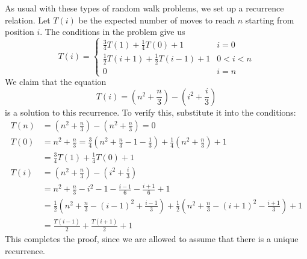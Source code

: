 \documentclass[11pt,letterpaper]{article}
\begin{document}
\begin{solution}
    As usual with these types of random walk problems, we set up a recurrence relation. Let $T(i)$ be the expected number of moves to reach $n$ starting from position $i$. The conditions in the problem give us 
    \[
        T(i)=\begin{cases}
            \frac{3}{4}T(1)+\frac{1}{4}T(0)+1& i = 0\\
            \frac{1}{2}T(i+1)+\frac{1}{2}T(i-1)+1& 0 < i < n\\
            0& i = n
        \end{cases}
    \] 
    We claim that the equation 
    \[
        T(i) = \left(n^2+\frac{n}{3}\right)-\left(i^2+\frac{i}{3}\right)
    \]
    is a solution to this recurrence. To verify this, substitute it into the conditions:
    \[\begin{aligned}
        T(n) &= \left(n^2+\frac{n}{3}\right)-\left(n^2+\frac{n}{3}\right) = 0\\
        T(0) &= n^2 + \frac{n}{3} = \frac{3}{4}\left(n^2+\frac{n}{3}-1-\frac13\right)+\frac{1}{4}\left(n^2+\frac{n}{3}\right)+1\\
             &= \frac{3}{4}T(1)+\frac{1}{4}T(0)+1\\
        T(i) &= \left(n^2+\frac{n}{3}\right)-\left(i^2+\frac{i}{3}\right)\\
             &= n^2 + \frac{n}{3}-i^2-1-\frac{i-1}{6}-\frac{i+1}{6}+1\\
             &= \frac{1}{2}\left(n^2+\frac{n}{3}-(i-1)^2+\frac{i-1}{3}\right)+\frac{1}{2}\left(n^2+\frac{n}{3}-(i+1)^2-\frac{i+1}{3}\right)+1\\
             &= \frac{T(i-1)}{2}+\frac{T(i+1)}{2}+1
    \end{aligned}\]
    This completes the proof, since we are allowed to assume that there is a unique recurrence.
\end{solution}
\end{document}
